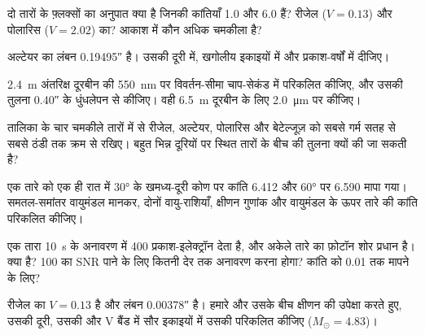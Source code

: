 \begin{exercise}[$\star$]\label{exo:b1:observing-the-sky:1}
दो तारों के फ़्लक्सों का अनुपात क्या है जिनकी कांतियाँ 1.0 और 6.0 हैं? रीजेल ($V = 0.13$) और
पोलारिस ($V = 2.02$) का? आकाश में कौन अधिक चमकीला है?
\end{exercise}

\begin{exercise}[$\star$]\label{exo:b1:observing-the-sky:2}
अल्टेयर का लंबन \ang{;;0.19495} है। उसकी दूरी  में, खगोलीय इकाइयों में और प्रकाश-वर्षों में दीजिए।
\end{exercise}

\begin{exercise}[$\star$]\label{exo:b1:observing-the-sky:3}
\qty{2.4}{m} अंतरिक्ष दूरबीन की \qty{550}{nm} पर विवर्तन-सीमा चाप-सेकंड में परिकलित कीजिए, और उसकी
तुलना \ang{;;0.40} के धुंधलेपन से कीजिए। वही \qty{6.5}{m} दूरबीन के लिए \qty{2.0}{\micro\metre} पर कीजिए।
\end{exercise}

\begin{exercise}[$\star$]\label{exo:b1:observing-the-sky:4}
तालिका के चार चमकीले तारों में से रीजेल, अल्टेयर, पोलारिस और बेटेल्जूज़ को सबसे गर्म सतह से सबसे
ठंडी तक क्रम से रखिए। बहुत भिन्न दूरियों पर स्थित तारों के बीच  की तुलना क्यों की जा
सकती है?
\end{exercise}

\begin{exercise}[$\star\star$]\label{exo:b1:observing-the-sky:5}
एक तारे को एक ही रात में \ang{30} के खमध्य-दूरी कोण पर कांति 6.412 और \ang{60} पर 6.590 मापा
गया। समतल-समांतर वायुमंडल मानकर, दोनों वायु-राशियाँ, क्षीणन गुणांक और वायुमंडल के ऊपर तारे की
कांति परिकलित कीजिए।
\end{exercise}

\begin{exercise}[$\star\star$]\label{exo:b1:observing-the-sky:6}
एक तारा \qty{10}{s} के अनावरण में 400 प्रकाश-इलेक्ट्रॉन देता है, और अकेले तारे का फ़ोटॉन शोर प्रधान
है।  क्या है? 100 का SNR पाने के लिए कितनी देर तक अनावरण करना होगा? कांति को
\num{0.01} तक मापने के लिए?
\end{exercise}

\begin{exercise}[$\star\star$]\label{exo:b1:observing-the-sky:7}
रीजेल का $V = 0.13$ है और लंबन \ang{;;0.00378} है। हमारे और उसके बीच क्षीणन की उपेक्षा करते हुए, उसकी
दूरी, उसकी  और V बैंड में सौर इकाइयों में उसकी  परिकलित कीजिए ($M_\odot = 4.83$)।
\end{exercise}

